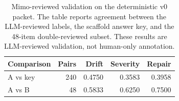 \begin{table}[t]
\centering
\scriptsize
\setlength{\tabcolsep}{3pt}
\begin{tabular}{lrrrr}
\toprule
Comparison & Pairs & Drift & Severity & Repair \\
\midrule
A vs key & 240 & 0.4750 & 0.3583 & 0.3958 \\
A vs B & 48 & 0.5833 & 0.6250 & 0.7500 \\
\bottomrule
\end{tabular}
\caption{Mimo-reviewed validation on the deterministic v0 packet. The table reports agreement between the LLM-reviewed labels, the scaffold answer key, and the 48-item double-reviewed subset. These results are LLM-reviewed validation, not human-only annotation.}
\label{tab:v0-llm-validation}
\end{table}
